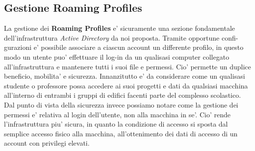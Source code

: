 \documentclass{report}
\begin{document}
			\subsection{Gestione Roaming Profiles}
				La gestione dei \textbf{Roaming Profiles} e' sicuramente una sezione fondamentale dell'infrastruttura
				\emph{Active Directory} da noi proposta. Tramite opportune confi-\\gurazioni e' possibile associare 
				a ciascun account un differente profilo, in questo modo un utente puo' effettuare il log-in da un
				qualisasi computer collegato all'infrastruttura e mantenere tutti i suoi file e permessi.
				Cio' permette un duplice beneficio, mobilita' e sicurezza. Innanzitutto e' da considerare come 
				un qualisasi studente o professore possa accedere ai suoi progetti e dati da qualsiasi macchina 
				all'interno di entrambi i gruppi di edifici facenti parte del complesso scolastico. Dal punto 
				di vista della sicurezza invece possiamo notare come la gestione dei permessi e' relativa al
				login dell'utente, non alla macchina in se'. Cio' rende l'infrastruttura piu' sicura, in quanto
				la condizione di accesso si sposta dal semplice accesso fisico alla macchina, all'ottenimento dei
				dati di accesso di un account con privilegi elevati.
\end{document}
